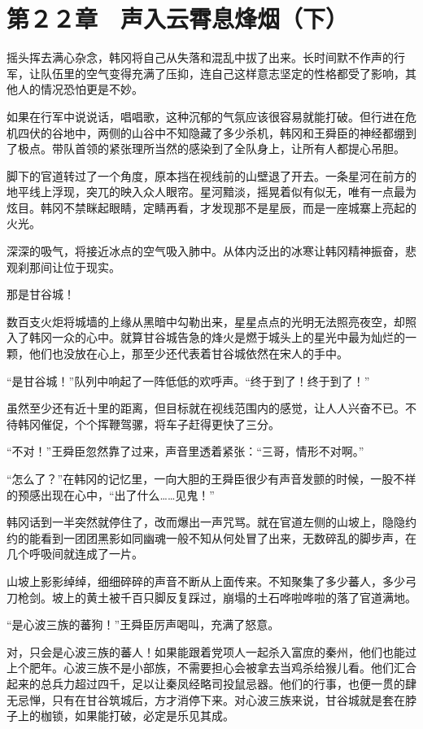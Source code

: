 \section{第２２章　声入云霄息烽烟（下）}

摇头挥去满心杂念，韩冈将自己从失落和混乱中拔了出来。长时间默不作声的行军，让队伍里的空气变得充满了压抑，连自己这样意志坚定的性格都受了影响，其他人的情况恐怕更是不妙。

如果在行军中说说话，唱唱歌，这种沉郁的气氛应该很容易就能打破。但行进在危机四伏的谷地中，两侧的山谷中不知隐藏了多少杀机，韩冈和王舜臣的神经都绷到了极点。带队首领的紧张理所当然的感染到了全队身上，让所有人都提心吊胆。

脚下的官道转过了一个角度，原本挡在视线前的山壁退了开去。一条星河在前方的地平线上浮现，突兀的映入众人眼帘。星河黯淡，摇晃着似有似无，唯有一点最为炫目。韩冈不禁眯起眼睛，定睛再看，才发现那不是星辰，而是一座城寨上亮起的火光。

深深的吸气，将接近冰点的空气吸入肺中。从体内泛出的冰寒让韩冈精神振奋，悲观刹那间让位于现实。

那是甘谷城！

数百支火炬将城墙的上缘从黑暗中勾勒出来，星星点点的光明无法照亮夜空，却照入了韩冈一众的心中。就算甘谷城告急的烽火是燃于城头上的星光中最为灿烂的一颗，他们也没放在心上，那至少还代表着甘谷城依然在宋人的手中。

“是甘谷城！”队列中响起了一阵低低的欢呼声。“终于到了！终于到了！”

虽然至少还有近十里的距离，但目标就在视线范围内的感觉，让人人兴奋不已。不待韩冈催促，个个挥鞭驾骡，将车子赶得更快了三分。

“不对！”王舜臣忽然靠了过来，声音里透着紧张：“三哥，情形不对啊。”

“怎么了？”在韩冈的记忆里，一向大胆的王舜臣很少有声音发颤的时候，一股不祥的预感出现在心中，“出了什么……见鬼！”

韩冈话到一半突然就停住了，改而爆出一声咒骂。就在官道左侧的山坡上，隐隐约约的能看到一团团黑影如同幽魂一般不知从何处冒了出来，无数碎乱的脚步声，在几个呼吸间就连成了一片。

山坡上影影绰绰，细细碎碎的声音不断从上面传来。不知聚集了多少蕃人，多少弓刀枪剑。坡上的黄土被千百只脚反复踩过，崩塌的土石哗啦哗啦的落了官道满地。

“是心波三族的蕃狗！”王舜臣厉声喝叫，充满了怒意。

对，只会是心波三族的蕃人！如果能跟着党项人一起杀入富庶的秦州，他们也能过上个肥年。心波三族不是小部族，不需要担心会被拿去当鸡杀给猴儿看。他们汇合起来的总兵力超过四千，足以让秦凤经略司投鼠忌器。他们的行事，也便一贯的肆无忌惮，只有在甘谷筑城后，方才消停下来。对心波三族来说，甘谷城就是套在脖子上的枷锁，如果能打破，必定是乐见其成。

